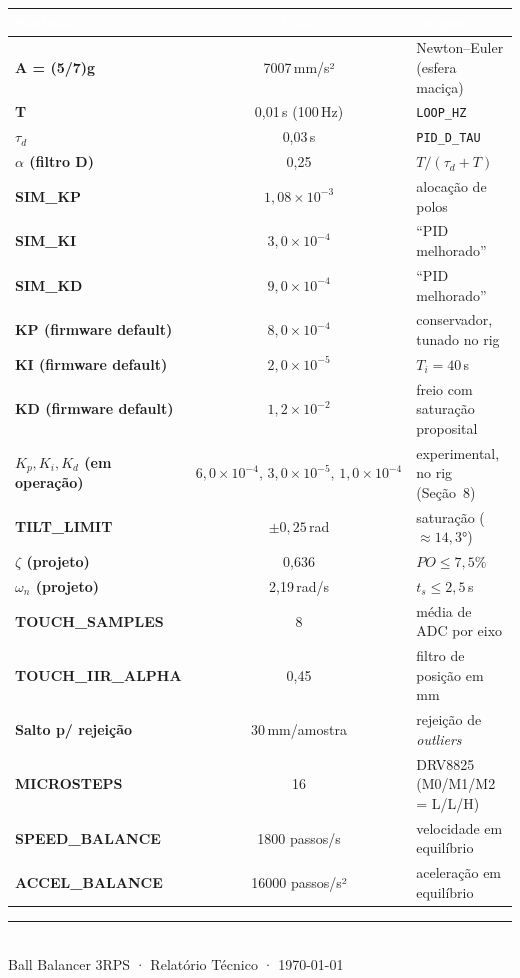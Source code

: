 \documentclass[11pt,a4paper,oneside]{article}
\newcommand{\rowstyle}{\rowcolor{rowgray}}
\begin{document}
\begin{center}
\small
\renewcommand{\arraystretch}{1.25}
\begin{tabularx}{\textwidth}{>{\ttfamily\bfseries}l c >{\RaggedRight\arraybackslash}X}
\toprule
\rowcolor{primary}
\textcolor{white}{Símbolo} & \textcolor{white}{Valor} & \textcolor{white}{\normalfont\bfseries Origem} \\
\midrule
A = (5/7)g & 7007\,mm/s² & Newton–Euler (esfera maciça) \\
\rowstyle T & 0,01\,s (100\,Hz) & \texttt{LOOP\_HZ} \\
$\tau_d$ & 0,03\,s & \texttt{PID\_D\_TAU} \\
\rowstyle $\alpha$ (filtro D) & 0,25 & $T/(\tau_d+T)$ \\
SIM\_KP & $1{,}08\times10^{-3}$ & alocação de polos \\
\rowstyle SIM\_KI & $3{,}0\times10^{-4}$ & ``PID melhorado'' \\
SIM\_KD & $9{,}0\times10^{-4}$ & ``PID melhorado'' \\
\rowstyle KP (firmware default) & $8{,}0\times10^{-4}$ & conservador, tunado no rig \\
KI (firmware default) & $2{,}0\times10^{-5}$ & $T_i = 40$\,s \\
\rowstyle KD (firmware default) & $1{,}2\times10^{-2}$ & freio com saturação proposital \\
$K_p,K_i,K_d$ (em operação) & $6{,}0{\times}10^{-4},\,3{,}0{\times}10^{-5},\,1{,}0{\times}10^{-4}$ & experimental, no rig (Seção~8) \\
TILT\_LIMIT & $\pm0{,}25$\,rad & saturação ($\approx 14{,}3°$) \\
\rowstyle $\zeta$ (projeto) & 0,636 & $PO\le 7{,}5\%$ \\
$\omega_n$ (projeto) & 2,19\,rad/s & $t_s\le 2{,}5$\,s \\
\rowstyle TOUCH\_SAMPLES & 8 & média de ADC por eixo \\
TOUCH\_IIR\_ALPHA & 0,45 & filtro de posição em mm \\
\rowstyle Salto p/ rejeição & 30\,mm/amostra & rejeição de \emph{outliers} \\
MICROSTEPS & 16 & DRV8825 (M0/M1/M2 = L/L/H) \\
\rowstyle SPEED\_BALANCE & 1800 passos/s & velocidade em equilíbrio \\
ACCEL\_BALANCE & 16000 passos/s² & aceleração em equilíbrio \\
\bottomrule
\end{tabularx}
\end{center}

\vfill
\begin{center}
{\color{primary}\rule{0.5\textwidth}{1pt}}\\[4pt]
{\small\color{inkdark}Ball Balancer 3RPS · Relatório Técnico · \today}
\end{center}
\end{document}
